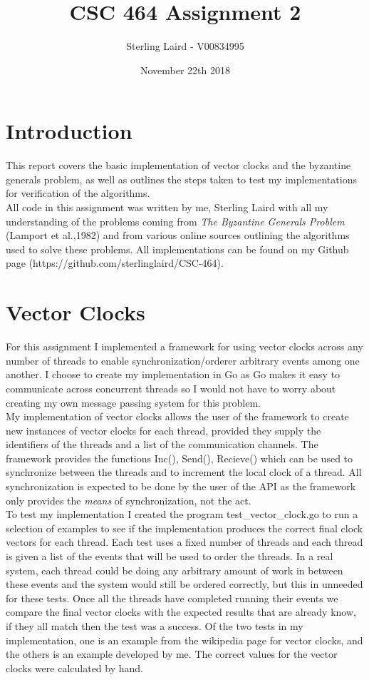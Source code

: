 \documentclass[11pt]{article}
\title{CSC 464 Assignment 2}
\author{Sterling Laird - V00834995}
\date{November 22th 2018}
\begin{document}
\maketitle

\section{Introduction}
This report covers the basic implementation of vector clocks and the byzantine generals problem, as well as outlines the steps taken to test my implementations for verification of the algorithms.\\

All code in this assignment was written by me, Sterling Laird with all my understanding of the problems coming from \textit{The Byzantine Generals Problem} (Lamport et al.,1982) and from various online sources outlining the algorithms used to solve these problems. All implementations can be found on my Github page (https://github.com/sterlinglaird/CSC-464).

\pagebreak

\section{Vector Clocks}
For this assignment I implemented a framework for using vector clocks across any number of threads to enable synchronization/orderer arbitrary events among one another. I choose to create my implementation in Go as Go makes it easy to communicate across concurrent threads so I would not have to worry about creating my own message passing system for this problem.\\

My implementation of vector clocks allows the user of the framework to create new instances of vector clocks for each thread, provided they supply the identifiers of the threads and a list of the communication channels. The framework provides the functions Inc(), Send(), Recieve() which can be used to synchronize between the threads and to increment the local clock of a thread. All synchronization is expected to be done by the user of the API as the framework only provides the \textit{means} of synchronization, not the act.\\

To test my implementation I created the program test\_vector\_clock.go to run a selection of examples to see if the implementation produces the correct final clock vectors for each thread. Each test uses a fixed number of threads and each thread is given a list of the events that will be used to order the threads. In a real system, each thread could be doing any arbitrary amount of work in between these events and the system would still be ordered correctly, but this in unneeded for these tests. Once all the threads have completed running their events we compare the final vector clocks with the expected results that are already know, if they all match then the test was a success. Of the two tests in my implementation, one is an example from the wikipedia page for vector clocks, and the others is an example developed by me. The correct values for the vector clocks were calculated by hand.
\end{document}
